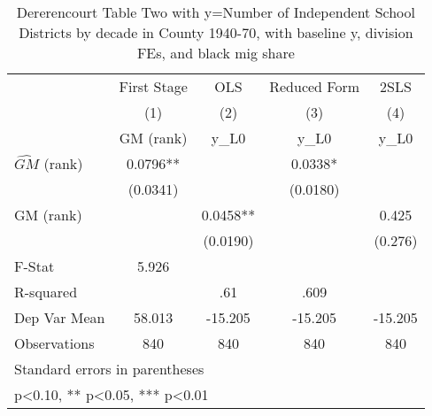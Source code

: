 \begin{table}[htbp]\centering
\def\sym#1{\ifmmode^{#1}\else\(^{#1}\)\fi}
\caption{Dererencourt Table Two with y=Number of Independent School Districts by decade in County 1940-70, with baseline y, division FEs, and black mig share}
\begin{tabular}{l*{4}{c}}
\toprule
                    & First Stage   &         OLS   &Reduced Form   &        2SLS   \\
                    &\multicolumn{1}{c}{(1)}&\multicolumn{1}{c}{(2)}&\multicolumn{1}{c}{(3)}&\multicolumn{1}{c}{(4)}\\
                    &\multicolumn{1}{c}{GM  (rank)}&\multicolumn{1}{c}{y\_L0}&\multicolumn{1}{c}{y\_L0}&\multicolumn{1}{c}{y\_L0}\\
\midrule
$\hat{GM}$ (rank)   &      0.0796** &               &      0.0338*  &               \\
                    &    (0.0341)   &               &    (0.0180)   &               \\
\addlinespace
GM  (rank)          &               &      0.0458** &               &       0.425   \\
                    &               &    (0.0190)   &               &     (0.276)   \\
\midrule
F-Stat              &       5.926   &               &               &               \\
R-squared           &               &         .61   &        .609   &               \\
Dep Var Mean        &      58.013   &     -15.205   &     -15.205   &     -15.205   \\
Observations        &         840   &         840   &         840   &         840   \\
\bottomrule
\multicolumn{5}{l}{\footnotesize Standard errors in parentheses}\\
\multicolumn{5}{l}{\footnotesize * p<0.10, ** p<0.05, *** p<0.01}\\
\end{tabular}
\end{table}
